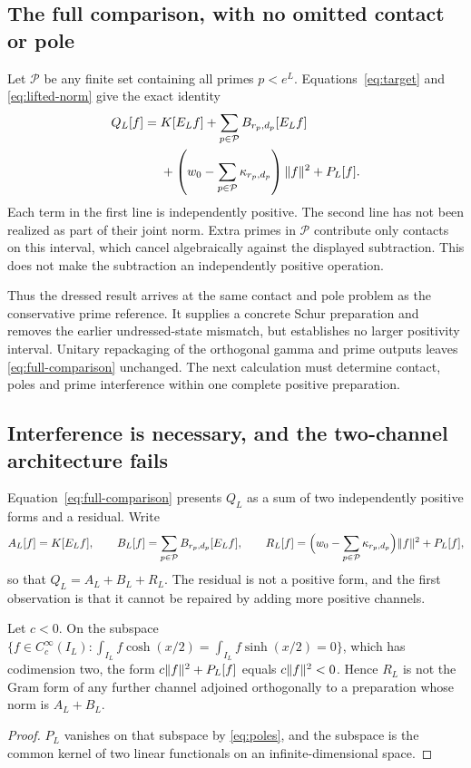 \subsection{The full comparison, with no omitted contact or pole}
Let $\mathcal P$ be any finite set containing all primes $p<e^L$.
Equations~\eqref{eq:target} and \eqref{eq:lifted-norm} give the exact
identity
\begin{align}
 Q_L[f]={}&K[E_Lf]+\sum_{p\in\mathcal P}B_{r_p,d_p}[E_Lf]
 \notag\\
 &+\left(w_0-\sum_{p\in\mathcal P}\kappa_{r_p,d_p}\right)\lVert f\rVert^2
 +P_L[f].
 \label{eq:full-comparison}
\end{align}
Each term in the first line is independently positive. The second
line has not been realized as part of their joint norm. Extra primes
in $\mathcal P$ contribute only contacts on this interval, which
cancel algebraically against the displayed subtraction. This does
not make the subtraction an independently positive operation.

Thus the dressed result arrives at the same contact and pole problem
as the conservative prime reference. It supplies a concrete Schur
preparation and removes the earlier undressed-state mismatch, but
establishes no larger positivity interval. Unitary repackaging of the
orthogonal gamma and prime outputs leaves \eqref{eq:full-comparison}
unchanged. The next calculation must determine contact, poles and
prime interference within one complete positive preparation.

\subsection{Interference is necessary, and the two-channel architecture fails}
\label{subsec:interference}
Equation~\eqref{eq:full-comparison} presents $Q_L$ as a sum of two
independently positive forms and a residual. Write
\begin{equation}\label{eq:channels}
 A_L[f]=K[E_Lf],\qquad
 B_L[f]=\sum_{p\in\mathcal P}B_{r_p,d_p}[E_Lf],\qquad
 R_L[f]=\Big(w_0-\sum_{p\in\mathcal P}\kappa_{r_p,d_p}\Big)\lVert f\rVert^2+P_L[f],
\end{equation}
so that $Q_L=A_L+B_L+R_L$. The residual is not a positive form, and the
first observation is that it cannot be repaired by adding more positive
channels.

\begin{proposition}\label{prop:no-augment}
Let $c<0$. On the subspace
$\{f\in C_c^\infty(I_L):\int_{I_L}f\cosh(x/2)=\int_{I_L}f\sinh(x/2)=0\}$,
which has codimension two, the form $c\lVert f\rVert^2+P_L[f]$ equals
$c\lVert f\rVert^2<0$. Hence $R_L$ is not the Gram form of any further channel
adjoined orthogonally to a preparation whose norm is $A_L+B_L$.
\end{proposition}
\begin{proof}
$P_L$ vanishes on that subspace by \eqref{eq:poles}, and the subspace is the
common kernel of two linear functionals on an infinite-dimensional space.
\end{proof}


